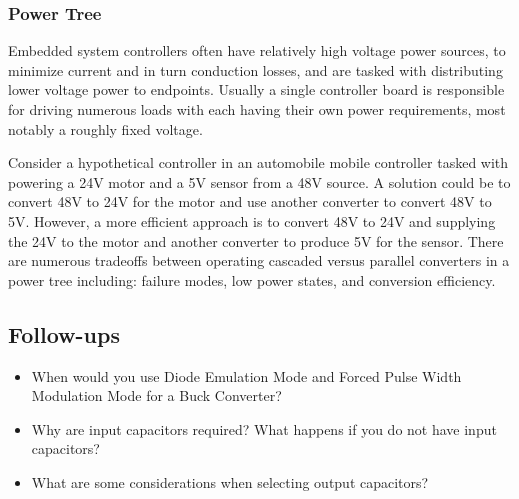\documentclass[main.tex]{subfiles}
\begin{document}
\subsubsection{Power Tree}
Embedded system controllers often have relatively high voltage power sources, to minimize current and in turn conduction losses, and are tasked with distributing lower voltage power to endpoints. Usually a single controller board is responsible for driving numerous loads with each having their own power requirements, most notably a roughly fixed voltage. 

Consider a hypothetical controller in an automobile mobile controller tasked with powering a 24V motor and a 5V sensor from a 48V source. A solution could be to convert 48V to 24V for the motor and use another converter to convert 48V to 5V. However, a more efficient approach is to convert 48V to 24V and supplying the 24V to the motor and another converter to produce 5V for the sensor. There are numerous tradeoffs between operating cascaded versus parallel converters in a power tree including: failure modes, low power states, and conversion efficiency. 

\subsection{Follow-ups}
\begin{itemize}
    \item When would you use Diode Emulation Mode and Forced Pulse Width Modulation Mode for a Buck Converter?  %
    \item Why are input capacitors required? What happens if you do not have input capacitors? %
    \item What are some considerations when selecting output capacitors? %
\end{itemize}
\end{document}
